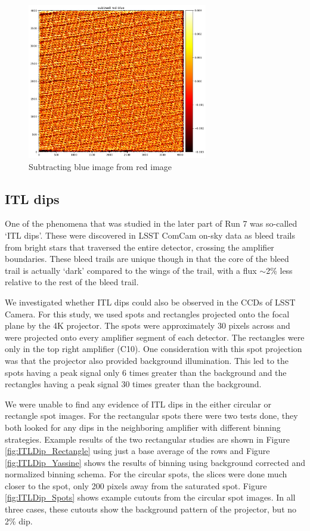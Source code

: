 \begin{figure}[ht]
\centering
\includegraphics[width=0.7\textwidth]{figures/subtract_red_blue.png}
\caption{Subtracting blue image from red image}
\label{fig:tree_ring_subtract_red_blue}
\end{figure}

\clearpage
\subsection{ITL dips}\label{itl-dips}

One of the phenomena that was studied in the later part of Run 7 was so-called 
`ITL dips'. These were discovered in LSST ComCam on-sky data as
bleed trails from bright stars that traversed the entire detector,
crossing the amplifier boundaries. These bleed trails are unique
though in that the core of the bleed trail is actually `dark'
compared to the wings of the trail, with a flux $\sim$2\% less relative to the rest of the
bleed trail.

We investigated whether ITL dips could also be observed in the CCDs of
LSST Camera. For this study, we used spots and rectangles projected onto the focal plane by the 4K
projector. The spots were approximately 30 pixels across
and were projected onto every amplifier segment of each detector. The rectangles were only
in the top right amplifier (C10). One consideration with this spot
projection was that the projector also provided background illumination. This led to the spots having a peak signal only 6 times greater
than the background and the rectangles having a peak signal 30 times greater
than the background.

We were unable to find any evidence of ITL
dips in the either circular or rectangle spot images. For the rectangular spots there were two tests done, they both looked for any dips in the neighboring amplifier with different binning strategies. Example results of the two rectangular studies are shown in Figure \ref{fig:ITLDip_Rectangle} using just a base average of the rows and Figure \ref{fig:ITLDip_Yassine} shows the results of binning using background corrected and normalized binning schema. For the circular spots, the slices were done much closer to the spot, only 200 pixels away from the saturated spot. Figure \ref{fig:ITLDip_Spots} shows example cutouts from the circular spot images. In all three cases, these cutouts show the background
pattern of the projector, but no 2\% dip.

